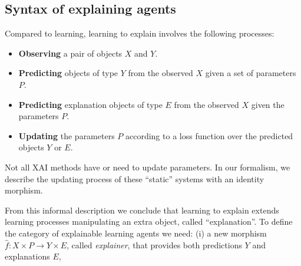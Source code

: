 \subsection{Syntax of explaining agents}
\label{sec:x-learning-agent}
Compared to learning, learning to explain involves the following processes:
\begin{itemize}
    \item \textbf{Observing} a pair of objects $X$ and $Y$.
    \item \textbf{Predicting} objects of type $Y$ from the observed $X$ given a set of parameters $P$.
    \item \textbf{Predicting} explanation objects of type $E$
    from the observed $X$ given the parameters $P$.
     \item \textbf{Updating} the parameters $P$ according to a loss function over the predicted objects $Y$ or $E$.
\end{itemize}
\begin{remark}
    Not all XAI methods have or need to update parameters. In our formalism, we describe the updating process of these ``static'' systems with an identity morphism.
\end{remark}
From this informal description we conclude that learning to explain extends learning processes manipulating an extra object, called ``explanation''. To define the category of explainable learning agents we need: (i) a new morphism $\hat{f}: X \times P \rightarrow Y \times E$, called \textit{explainer}, that provides both predictions $Y$ and explanations $E$,
